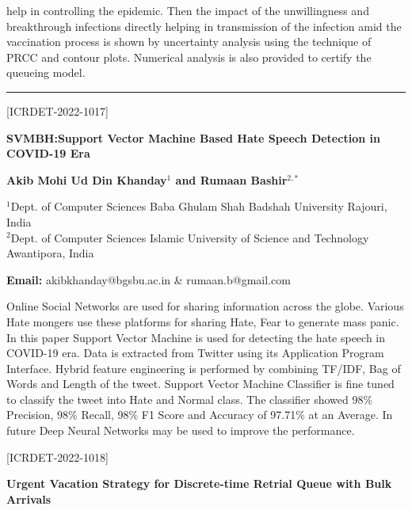 \documentclass[twoside,11pt]{amsart}
\begin{document}
help in controlling the epidemic. Then the impact of the unwillingness and
breakthrough infections directly helping in transmission of the infection amid
the vaccination process is shown by uncertainty analysis using the technique of PRCC and contour plots. Numerical analysis is also provided to certify the
queueing model.
\vskip 2mm
\rule{\textwidth}{0.5pt}
\vskip 5mm
\begin{flushleft}
\centerline{[ICRDET-2022-1017]}
\end{flushleft}
\begin{center}\bf\LARGE
SVMBH:Support Vector Machine Based Hate Speech Detection in COVID-19 Era


\end{center}
\vskip 5mm

\centerline{\textbf{Akib Mohi Ud Din Khanday$^{1}$ and Rumaan Bashir$^{2,*}$  }}
\vskip 5mm
\begin{flushleft}
$^{1}$Dept. of Computer Sciences
Baba Ghulam Shah Badshah  University
Rajouri, India\\
$^{2}$Dept. of Computer Sciences
Islamic University of Science and Technology
Awantipora, India

\vskip 5mm
\end{flushleft}
\vskip 2mm
\begin{flushleft}
{\bf Email:} akibkhanday@bgsbu.ac.in  \& rumaan.b@gmail.com
\end{flushleft}
\vskip 5mm
Online Social Networks are used for sharing information across the globe. Various Hate mongers use these platforms for sharing Hate, Fear to generate mass panic. In this paper Support Vector Machine is used for detecting the hate speech in COVID-19 era. Data is extracted from Twitter using its Application Program Interface. Hybrid feature engineering is performed by combining TF/IDF, Bag of Words and Length of the tweet. Support Vector Machine Classifier is fine tuned to classify the tweet into Hate and Normal class. The classifier showed 98\% Precision, 98\% Recall, 98\% F1 Score and Accuracy of 97.71\% at an Average. In future Deep Neural Networks may be used to improve the performance.
\newpage
\vskip 5mm
\begin{flushleft}
\centerline{[ICRDET-2022-1018]}
\end{flushleft}
\begin{center}\bf\LARGE
Urgent Vacation Strategy for Discrete-time Retrial Queue with Bulk Arrivals


\end{center}
\vskip 5mm
\end{document}
